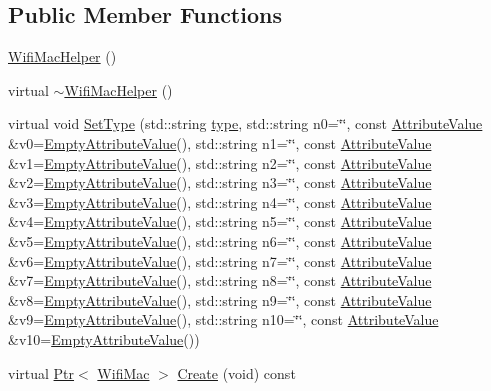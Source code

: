 \subsection*{Public Member Functions}
\begin{DoxyCompactItemize}
\item 
\hyperlink{classns3_1_1WifiMacHelper_a797b0091ffbc8d777aa57a6d961c681d}{Wifi\+Mac\+Helper} ()
\item 
virtual \hyperlink{classns3_1_1WifiMacHelper_a349ecf56b680479cebbdf145a2975251}{$\sim$\+Wifi\+Mac\+Helper} ()
\item 
virtual void \hyperlink{classns3_1_1WifiMacHelper_a382d8df76a1dd7007179d1963b4b6bc6}{Set\+Type} (std\+::string \hyperlink{visualizer-ideas_8txt_add98db9e15e2a58cf2b57623e7aa893a}{type}, std\+::string n0=\char`\"{}\char`\"{}, const \hyperlink{classns3_1_1AttributeValue}{Attribute\+Value} \&v0=\hyperlink{classns3_1_1EmptyAttributeValue}{Empty\+Attribute\+Value}(), std\+::string n1=\char`\"{}\char`\"{}, const \hyperlink{classns3_1_1AttributeValue}{Attribute\+Value} \&v1=\hyperlink{classns3_1_1EmptyAttributeValue}{Empty\+Attribute\+Value}(), std\+::string n2=\char`\"{}\char`\"{}, const \hyperlink{classns3_1_1AttributeValue}{Attribute\+Value} \&v2=\hyperlink{classns3_1_1EmptyAttributeValue}{Empty\+Attribute\+Value}(), std\+::string n3=\char`\"{}\char`\"{}, const \hyperlink{classns3_1_1AttributeValue}{Attribute\+Value} \&v3=\hyperlink{classns3_1_1EmptyAttributeValue}{Empty\+Attribute\+Value}(), std\+::string n4=\char`\"{}\char`\"{}, const \hyperlink{classns3_1_1AttributeValue}{Attribute\+Value} \&v4=\hyperlink{classns3_1_1EmptyAttributeValue}{Empty\+Attribute\+Value}(), std\+::string n5=\char`\"{}\char`\"{}, const \hyperlink{classns3_1_1AttributeValue}{Attribute\+Value} \&v5=\hyperlink{classns3_1_1EmptyAttributeValue}{Empty\+Attribute\+Value}(), std\+::string n6=\char`\"{}\char`\"{}, const \hyperlink{classns3_1_1AttributeValue}{Attribute\+Value} \&v6=\hyperlink{classns3_1_1EmptyAttributeValue}{Empty\+Attribute\+Value}(), std\+::string n7=\char`\"{}\char`\"{}, const \hyperlink{classns3_1_1AttributeValue}{Attribute\+Value} \&v7=\hyperlink{classns3_1_1EmptyAttributeValue}{Empty\+Attribute\+Value}(), std\+::string n8=\char`\"{}\char`\"{}, const \hyperlink{classns3_1_1AttributeValue}{Attribute\+Value} \&v8=\hyperlink{classns3_1_1EmptyAttributeValue}{Empty\+Attribute\+Value}(), std\+::string n9=\char`\"{}\char`\"{}, const \hyperlink{classns3_1_1AttributeValue}{Attribute\+Value} \&v9=\hyperlink{classns3_1_1EmptyAttributeValue}{Empty\+Attribute\+Value}(), std\+::string n10=\char`\"{}\char`\"{}, const \hyperlink{classns3_1_1AttributeValue}{Attribute\+Value} \&v10=\hyperlink{classns3_1_1EmptyAttributeValue}{Empty\+Attribute\+Value}())
\item 
virtual \hyperlink{classns3_1_1Ptr}{Ptr}$<$ \hyperlink{classns3_1_1WifiMac}{Wifi\+Mac} $>$ \hyperlink{classns3_1_1WifiMacHelper_a70d27e75e3460e5b7fd56b7ddde346a4}{Create} (void) const 
\end{DoxyCompactItemize}
